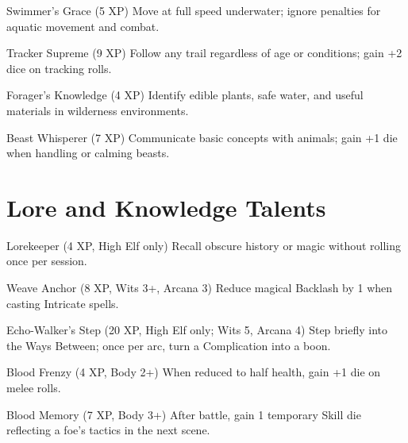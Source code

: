 \documentclass[11pt]{article}
\begin{document}
\begin{talentbox}{Swimmer's Grace (5 XP)}
Move at full speed underwater; ignore penalties for aquatic movement and combat.
\end{talentbox}

\begin{talentbox}{Tracker Supreme (9 XP)}
Follow any trail regardless of age or conditions; gain +2 dice on tracking rolls.
\end{talentbox}

\begin{talentbox}{Forager's Knowledge (4 XP)}
Identify edible plants, safe water, and useful materials in wilderness environments.
\end{talentbox}

\begin{talentbox}{Beast Whisperer (7 XP)}
Communicate basic concepts with animals; gain +1 die when handling or calming beasts.
\end{talentbox}

\section*{Lore and Knowledge Talents}

\begin{talentbox}{Lorekeeper (4 XP, High Elf only)}
Recall obscure history or magic without rolling once per session.
\end{talentbox}

\begin{talentbox}{Weave Anchor (8 XP, Wits 3+, Arcana 3)}
Reduce magical Backlash by 1 when casting Intricate spells.
\end{talentbox}

\begin{talentbox}{Echo-Walker's Step (20 XP, High Elf only; Wits 5, Arcana 4)}
Step briefly into the Ways Between; once per arc, turn a Complication into a boon.
\end{talentbox}

\begin{talentbox}{Blood Frenzy (4 XP, Body 2+)}
When reduced to half health, gain +1 die on melee rolls.
\end{talentbox}

\begin{talentbox}{Blood Memory (7 XP, Body 3+)}
After battle, gain 1 temporary Skill die reflecting a foe's tactics in the next scene.
\end{talentbox}
\end{document}
